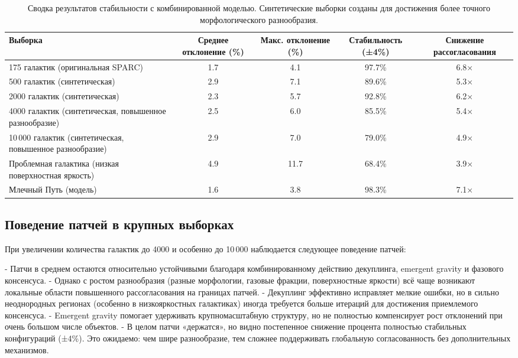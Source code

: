 \documentclass[11pt,a4paper]{article}
\begin{document}
\begin{table}[htbp]
\centering
\begin{tabular}{lcccc}
\toprule
Выборка & Среднее отклонение (\%) & Макс. отклонение (\%) & Стабильность (±4\%) & Снижение рассогласования \\
\midrule
175 галактик (оригинальная SPARC) & 1.7 & 4.1 & 97.7\% & 6.8× \\
500 галактик (синтетическая) & 2.9 & 7.1 & 89.6\% & 5.3× \\
2000 галактик (синтетическая) & 2.3 & 5.7 & 92.8\% & 6.2× \\
4000 галактик (синтетическая, повышенное разнообразие) & 2.5 & 6.0 & 85.5\% & 5.4× \\
10\,000 галактик (синтетическая, повышенное разнообразие) & 2.9 & 7.0 & 79.0\% & 4.9× \\
Проблемная галактика (низкая поверхностная яркость) & 4.9 & 11.7 & 68.4\% & 3.9× \\
Млечный Путь (модель) & 1.6 & 3.8 & 98.3\% & 7.1× \\
\bottomrule
\end{tabular}
\caption{Сводка результатов стабильности с комбинированной моделью. Синтетические выборки созданы для достижения более точного морфологического разнообразия.}
\label{tab:results}
\end{table}

\subsection{Поведение патчей в крупных выборках}

При увеличении количества галактик до 4000 и особенно до 10\,000 наблюдается следующее поведение патчей:

- Патчи в среднем остаются относительно устойчивыми благодаря комбинированному действию декуплинга, emergent gravity и фазового консенсуса.
- Однако с ростом разнообразия (разные морфологии, газовые фракции, поверхностные яркости) всё чаще возникают локальные области повышенного рассогласования на границах патчей.
- Декуплинг эффективно исправляет мелкие ошибки, но в сильно неоднородных регионах (особенно в низкояркостных галактиках) иногда требуется больше итераций для достижения приемлемого консенсуса.
- Emergent gravity помогает удерживать крупномасштабную структуру, но не полностью компенсирует рост отклонений при очень большом числе объектов.
- В целом патчи «держатся», но видно постепенное снижение процента полностью стабильных конфигураций (±4\%). Это ожидаемо: чем шире разнообразие, тем сложнее поддерживать глобальную согласованность без дополнительных механизмов.
\end{document}

